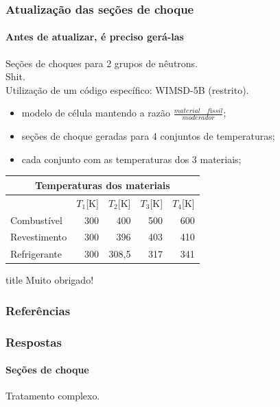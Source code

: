\documentclass[svgnames,smaller,table]{beamer}
\begin{document}
\begin{frame}
  \frametitle{Atualização das seções de choque}
  \framesubtitle{Antes de atualizar, é preciso \textbf{gerá-las}}
  Seções de choques para 2 grupos de nêutrons.\\
  \vspace{0.2cm}
  Shit.\\
  \vspace{0.2cm}
  Utilização de um código específico: WIMSD-5B (\alert{restrito}).\\
  \vspace{0.2cm}
  \begin{itemize}
  \item modelo de célula mantendo a razão $\frac{material\quad físsil}{moderador}$;
  \item seções de choque geradas para 4 conjuntos de temperaturas;
  \item cada conjunto com as temperaturas dos 3 materiais;
  \end{itemize}
  \centering
  \vspace{0.2cm}
  \begin{tabular}{lrrrr}
    \multicolumn{5}{c}{Temperaturas dos materiais}                                                                                                       \\ \hline
    & \multicolumn{1}{l}{$T_1${[}K{]}} & \multicolumn{1}{l}{$T_2${[}K{]}} & \multicolumn{1}{l}{$T_3${[}K{]}} & \multicolumn{1}{l}{$T_4${[}K{]}}      \\ \hline
    Combustível  & 300                             & 400                             & 500                             & 600                             \\ \hline
    Revestimento & 300                             & 396                             & 403                             & 410                             \\ \hline
    Refrigerante & 300                             & 308,5                           & 317                             & 341                            
  \end{tabular}
\end{frame}

\begin{frame}[allowframebreaks]
 \vfill
  \begin{beamercolorbox}[center]{title}
     \Huge{Muito obrigado!}
  \end{beamercolorbox}
  \vfill

\end{frame}

\begin{frame}[allowframebreaks]
        \frametitle{Referências}
        
        
\end{frame}


\begin{frame}[noframenumbering]
  \frametitle{Respostas}
  \framesubtitle{Seções de choque}
  Tratamento complexo.
\end{frame}
\end{document}
